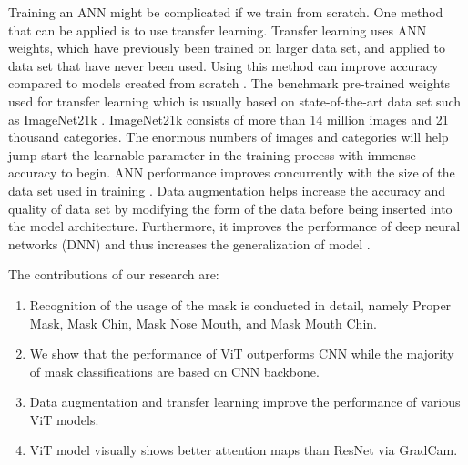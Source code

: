 \documentclass{article}
\begin{document}
Training an ANN might be complicated if we train from scratch. One method that can be applied is to use transfer learning. Transfer learning uses ANN weights, which have previously been trained on larger data set, and applied to data set that have never been used. Using this method can improve accuracy compared to models created from scratch \citep{Barman2019}. The benchmark pre-trained weights used for transfer learning which is usually based on state-of-the-art data set such as ImageNet21k \citep{deng2009imagenet}. ImageNet21k consists of more than 14 million images and 21 thousand categories. The enormous numbers of images and categories will help jump-start the learnable parameter in the training process with immense accuracy to begin.
ANN performance improves concurrently with the size of the data set used in training \citep{alom2019datasetsize}. Data augmentation helps increase the accuracy and quality of data set by modifying the form of the data before being inserted into the model architecture. Furthermore, it improves the performance of deep neural networks (DNN) and thus increases the generalization of model \citep{Wang2016}.

The contributions of our research are:
\begin{enumerate}
	\item Recognition of the usage of the mask is conducted in detail, namely Proper Mask, Mask Chin, Mask Nose Mouth, and Mask Mouth Chin.
	\item We show that the performance of ViT outperforms CNN while the majority of mask classifications are based on CNN backbone.
	\item Data augmentation and transfer learning improve the performance of various ViT models.
	\item ViT model visually shows better attention maps than ResNet via GradCam.
\end{enumerate}
\end{document}
